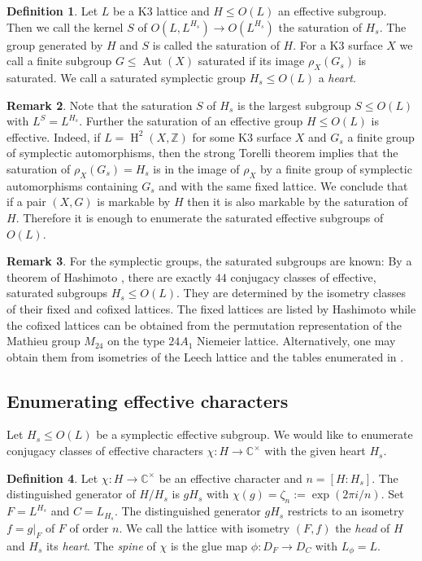\documentclass[a4paper]{amsart}
\theoremstyle{definition}
\newtheorem{definition}{Definition}[section]
\newtheorem{remark}[definition]{Remark}
\theoremstyle{plain}
\DeclareMathOperator{\Aut}{Aut}
\DeclareMathOperator{\HH}{H}
\newcommand{\CC}{\mathbb{C}}
\newcommand{\ZZ}{\mathbb{Z}}
\newcommand{\disc}[1]{{D_{#1}}}
\begin{document}
\begin{definition}
 Let $L$ be a K3 lattice and $H \leq O(L)$ an effective subgroup. Then we call the kernel $S$ of $O(L,L^{H_s}) \to O(L^{H_s})$ the saturation of $H_s$.
 The group generated by $H$ and $S$ is called the saturation of $H$.
 For a K3 surface $X$ we call a finite subgroup $G\leq \Aut(X)$ saturated if its image $\rho_X(G_s)$ is saturated.
 We call a saturated symplectic group $H_s\leq O(L)$ a \emph{heart}.
\end{definition}

\begin{remark}
Note that the saturation $S$ of $H_s$ is the largest subgroup $S\leq O(L)$ with $L^S=L^{H_s}$. Further the saturation of an effective group $H\leq O(L)$ is effective.
Indeed, if $L = \HH^2(X,\ZZ)$ for some K3 surface $X$ and $G_s$ a finite group of symplectic automorphisms, then the strong Torelli theorem implies that the saturation of $\rho_X(G_s)=H_s$ is in the image of $\rho_X$ by a finite group of symplectic automorphisms containing $G_s$ and with the same fixed lattice.
We conclude that if a pair $(X,G)$ is markable by $H$ then it is also markable by the saturation of $H$.
Therefore it is enough to enumerate the saturated effective subgroups of $O(L)$.
\end{remark}

\begin{remark}\label{rem:hashimoto}
For the symplectic groups, the saturated subgroups are known:
By a theorem of Hashimoto \cite{Hashimoto2012}, there are exactly $44$ conjugacy classes of effective, saturated subgroups $H_s \leq O(L)$.
They are determined by the isometry classes of their fixed and cofixed lattices.
The fixed lattices are listed by Hashimoto while the cofixed lattices can be obtained from the permutation representation of the Mathieu group $M_{24}$ on the type $24 A_1$ Niemeier lattice.
Alternatively, one may obtain them from isometries of the Leech lattice and the tables enumerated in \cite{mason2016}.
\end{remark}

\subsection{Enumerating effective characters}
Let $H_s \leq O(L)$ be a symplectic effective subgroup.
We would like to enumerate conjugacy classes of effective characters $\chi \colon H \to \CC^\times$
with the given heart $H_s$.

\begin{definition}
Let $\chi\colon H \to \CC^\times$ be an effective character and $n=[H:H_s]$.
The distinguished generator of $H/H_s$ is $g H_s$ with $\chi(g) = \zeta_n:= \exp(2\pi i /n)$.
Set $F = L^{H_s}$ and $C= L_{H_s}$. The distinguished generator $gH_s$ restricts to an isometry $f=g|_F$ of $F$ of order $n$. We call the lattice with isometry $(F,f)$ the \emph{head} of $H$ and $H_s$ its \emph{heart}.
The \emph{spine} of $\chi$ is the glue map $\phi\colon \disc{F} \to \disc{C}$
with $L_\phi = L$.
\end{definition}
\end{document}
